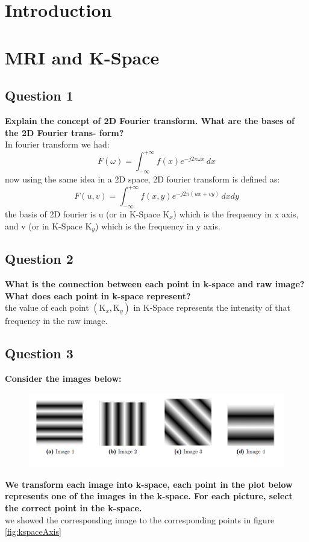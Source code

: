 \documentclass[11pt]{article}
\begin{document}
\tableofcontents
\thispagestyle{empty}
\clearpage
\setcounter{page}{1}

\section{Introduction}
\section{MRI and K-Space}
\subsection{Question 1} 
\textbf{Explain the concept of 2D Fourier transform. What are the bases of the 2D Fourier trans-
form?} \\
In fourier transform we had:
$$ F(\omega) = \int_{-\infty}^{+\infty} f(x) e^{-j 2 \pi \omega x}\, dx$$
now using the same idea in a 2D space, 2D fourier transform is defined as:
$$ F(u,v) = \int_{-\infty}^{+\infty} f(x,y) e^{-j 2 \pi (ux + vy)}\, dxdy$$
the basis of 2D fourier is u (or in K-Space $\mathrm{K}_x$) which is the frequency in x axis,
and v (or in K-Space $\mathrm{K}_y$) which is the frequency in y axis.

\subsection{Question 2}
\textbf{What is the connection between each point in k-space and raw image? What does each
point in k-space represent?} \\
the value of each point $(\mathrm{K}_x,\mathrm{K}_y)$ in K-Space represents the intensity of that frequency
in the raw image.

\subsection{Question 3}
\textbf{Consider the images below:} \\
\begin{figure}[H]
    \begin{center}
        \includegraphics[scale=0.5]{Fig/2.3.kspace.images.png}
    \end{center}
\end{figure}
\textbf{We transform each image into k-space, each point in the plot below represents one of the images
in the k-space. For each picture, select the correct point in the k-space.} \\
we showed the corresponding image to the corresponding points in figure \ref*{fig:kspaceAxis}
\end{document}
